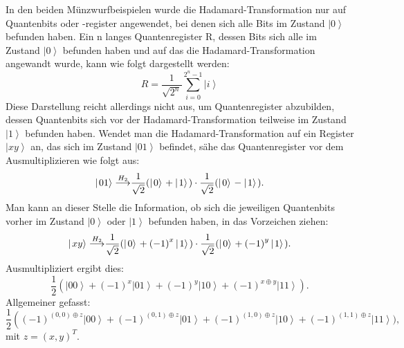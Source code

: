 In den beiden Münzwurfbeispielen wurde die Hadamard-Transformation nur auf Quantenbits oder -register angewendet, bei denen sich alle Bits im Zustand $\left|0\right\rangle$ befunden haben. Ein n langes Quantenregister R, dessen Bits sich alle im Zustand $\left|0\right\rangle$ befunden haben und auf das die Hadamard-Transformation angewandt wurde, kann wie folgt dargestellt werden:
\begin{equation}
    R=\frac{1}{\sqrt{2^n}}\sum_{i=0}^{2^n-1}\left|\left.i\right\rangle\right.
\end{equation}
Diese Darstellung reicht allerdings nicht aus, um Quantenregister abzubilden, dessen Quantenbits sich vor der Hadamard-Transformation teilweise im Zustand $\left|1\right\rangle$ befunden haben. Wendet man die Hadamard-Transformation auf ein Register $\left|xy\right\rangle$ an, das sich im Zustand $\left|01\right\rangle$ befindet, sähe das Quantenregister vor dem Ausmultiplizieren wie folgt aus:
\begin{equation}
    \left|\left.01\right\rangle\right.{\buildrel H_2\over\longrightarrow}\frac{1}{\sqrt2}(\left|\left.0\right\rangle\right.+\left|\left.1\right\rangle\right.)\cdot\frac{1}{\sqrt2}(\left|\left.0\right\rangle\right.-\left|\left.1\right\rangle\right.).
\end{equation}
Man kann an dieser Stelle die Information, ob sich die jeweiligen Quantenbits vorher im Zustand $\left|0\right\rangle$ oder $\left|1\right\rangle$ befunden haben, in das Vorzeichen ziehen:
\begin{equation}
    \left|\left.xy\right\rangle\right.{\buildrel H_2\over\longrightarrow}\frac{1}{\sqrt2}(\left|\left.0\right\rangle\right.+{(-1)}^x\left|\left.1\right\rangle\right.)\cdot\frac{1}{\sqrt2}(\left|\left.0\right\rangle\right.+{(-1)}^y\left|\left.1\right\rangle\right.).
\end{equation}
Ausmultipliziert ergibt dies: 
\begin{equation}
    \frac{1}{2}\left(\left|\left.00\right\rangle\right.+\left(-1\right)^x\left|\left.01\right\rangle\right.+\left(-1\right)^y\left|\left.10\right\rangle\right.+\left(-1\right)^{x\oplus y}\left|\left.11\right\rangle\right.\right).
\end{equation}
Allgemeiner gefasst:
\begin{equation}
    \frac{1}{2}\left(\left(-1\right)^{\left(0,0\right)\oplus z}\left|\left.00\right\rangle\right.+\left(-1\right)^{\left(0,1\right)\oplus z}\left|\left.01\right\rangle\right.+\left(-1\right)^{\left(1,0\right)\oplus z}\left|\left.10\right\rangle\right.+\left(-1\right)^{\left(1,1\right)\oplus z}\left|\left.11\right\rangle\right.\right.),
\end{equation}
mit $z={(x,y)}^T$.

